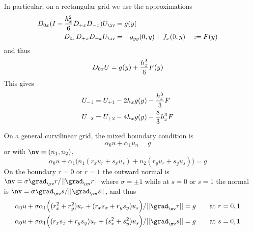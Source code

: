 In particular, on a rectangular grid we use the approximations
 \begin{align}
  D_{0x}( I - {h_x^2\over6} D_{+x}D_{-x}) U_\iv &= g(y) \\
  D_{0x} D_{+x}D_{-x} U_\iv &= - g_{yy}(0,y) + f_x(0,y) \quad := F(y)
\end{align}
and thus 
\[
   D_{0x}U = g(y) + {h_x^2\over6}F(y) 
\]
This gives
\begin{align}
    U_{-1} &= U_{+1} - 2 h_x g(y) - {h_x^3\over3} F  \\
    U_{-2} &= U_{+2} - 4 h_x g(y) - {8\over3}h_x^3 F  
\end{align}
   
\newcommand\norm[1]{\vert\vert#1\vert\vert}

On a general curvilinear grid, the mixed boundary condition is 
\[
  \alpha_0 u + \alpha_1 u_n = g
\]
or with $\nv=(n_1,n_2)$,
\[
  \alpha_0 u +\alpha_1 \Big( n_1( r_x u_r + s_x u_s ) + n_2 ( r_y u_r + s_y u_s ) \Big) = g
\]
On the boundary $r=0$ or $r=1$ the outward 
normal is $\nv = \sigma \grad_\xv r / \norm{\grad_\xv r} $ where $\sigma=\pm 1$
while at $s=0$ or $s=1$ the normal is $\nv = \sigma \grad_\xv s/ \norm{\grad_\xv s} $,
and thus
\begin{align}
  \alpha_0 u +\sigma\alpha_1 \Big( (r_x^2+r_y^2) u_r + (r_x s_x+ r_y s_y) u_s \Big)/\norm{\grad_\xv r} & = g \qquad\mbox{at $r=0,1$} \\
  \alpha_0 u +\sigma\alpha_1 \Big( (r_x s_x+ r_y s_y) u_r + (s_x^2+s_y^2) u_s \Big)/\norm{\grad_\xv s} & = g \qquad\mbox{at $s=0,1$}
\end{align}



